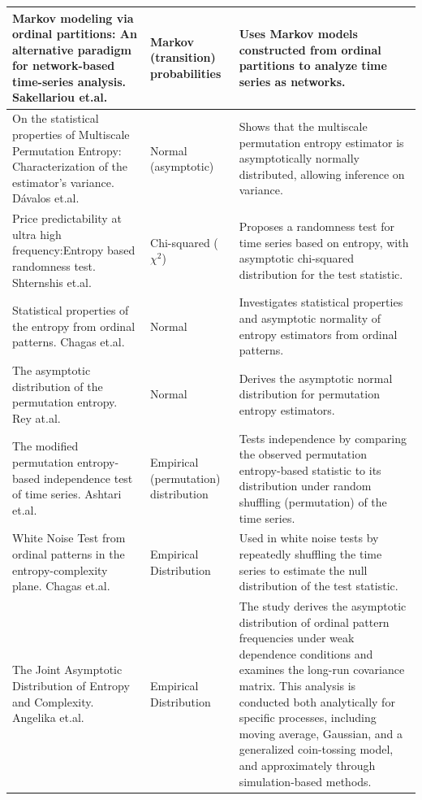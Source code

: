 \documentclass[12pt,a4paper]{article}
\begin{document}
\begin{longtable}{|p{5.5cm}|p{2.5cm}|p{6.5cm}|}
	\hline
	Markov modeling via ordinal partitions: An alternative paradigm for network-based time-series analysis. Sakellariou et.al.~\cite{Sakellariou2019} & Markov (transition) probabilities & Uses Markov models constructed from ordinal partitions to analyze time series as networks. \\
	\hline
	On the statistical properties of Multiscale Permutation Entropy: Characterization of the estimator's variance. Dávalos et.al.~\cite{Davalos2019a} & Normal (asymptotic) & Shows that the multiscale permutation entropy estimator is asymptotically normally distributed, allowing inference on variance.\\
	\hline
	Price predictability at ultra high frequency:Entropy based randomness test. Shternshis et.al.~\cite{Shternshis2025}& Chi-squared ($\chi^2$) & Proposes a randomness test for time series based on entropy, with asymptotic chi-squared distribution for the test statistic. \\
	\hline
	Statistical properties of the entropy from ordinal patterns. Chagas et.al.~\cite{Chagas2022} & Normal & Investigates statistical properties and asymptotic normality of entropy estimators from ordinal patterns. \\
	\hline
	The asymptotic distribution of the permutation entropy. Rey at.al.~\cite{Rey2023a} & Normal & Derives the asymptotic normal distribution for permutation entropy estimators. \\
	\hline
	The modified permutation entropy-based independence test of time series. Ashtari et.al.~\cite{AshtariNezhad2019} & Empirical (permutation) distribution & Tests independence by comparing the observed permutation entropy-based statistic to its distribution under random shuffling (permutation) of the time series.\\
	\hline
	White Noise Test from ordinal patterns in the entropy-complexity plane. Chagas et.al.~\cite{Chagas2022a} & Empirical Distribution & Used in white noise tests by repeatedly shuffling the time series to estimate the null distribution of the test statistic.\\
	\hline
	The Joint Asymptotic Distribution of Entropy and Complexity. Angelika et.al.~\cite{silbernagel2025joint} & Empirical Distribution & The study derives the asymptotic distribution of ordinal pattern frequencies under weak dependence conditions and examines the long-run covariance matrix. This analysis is conducted both analytically for specific processes, including moving average, Gaussian, and a generalized coin-tossing model, and approximately through simulation-based methods.\\
	\hline
	
\end{longtable}
\end{document}
